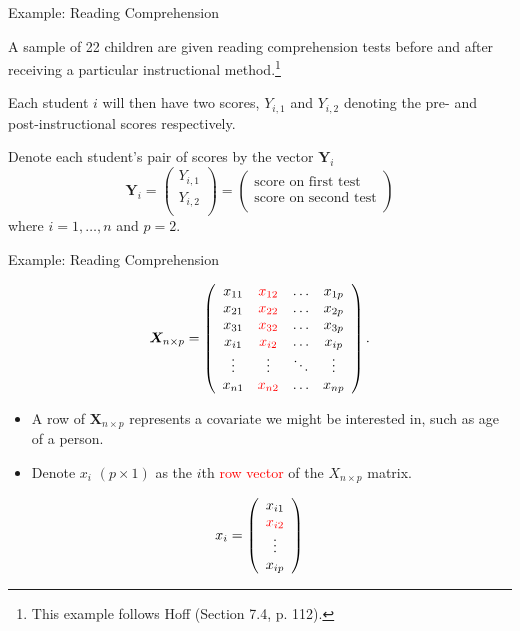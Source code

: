 \documentclass[
  ignorenonframetext,
]{beamer}
\begin{document}
\begin{frame}{Example: Reading Comprehension}
\protect\hypertarget{example-reading-comprehension}{}

A sample of 22 children are given reading comprehension tests before and
after receiving a particular instructional
method.\footnote{This example follows Hoff (Section 7.4, p. 112).}

Each student \(i\) will then have two scores, \(Y_{i,1}\) and
\(Y_{i,2}\) denoting the pre- and post-instructional scores
respectively.

Denote each student's pair of scores by the vector \(\bm{Y}_i\) \[
\bm{Y}_{i} = \left( \begin{array}{c}
Y_{i,1}\\
Y_{i,2}\\
\end{array} \right) 
= \left( \begin{array}{c}
\text{score on first test}\\
\text{score on second test}\\
\end{array} \right)
\] where \(i=1,\ldots,n\) and \(p=2.\)

\end{frame}

\begin{frame}{Example: Reading Comprehension}
\protect\hypertarget{example-reading-comprehension-1}{}

\[\bm{X}_{n \times p} = 
\left( \begin{array}{cccc}
x_{11} & \textcolor{red}{x_{12}} & \ldots&  x_{1p}\\
x_{21} & \textcolor{red}{x_{22}} & \ldots& x_{2p} \\
x_{31} & \textcolor{red}{x_{32}} & \ldots& x_{3p} \\
x_{i1} & \textcolor{red}{x_{i2}} & \ldots& x_{ip} \\
\vdots & \vdots & \ddots & \vdots \\
x_{n1} & \textcolor{red}{x_{n2}} &\ldots& x_{np}
\end{array} \right).
\]

\begin{itemize}
\item
  A row of \(\bm{X}_{n \times p}\) represents a covariate we might be
  interested in, such as age of a person.
\item
  Denote \(x_{i}\) \((p \times 1)\) as the \(i\)th
  \textcolor{red}{row vector} of the \(X_{n \times p}\) matrix.
\end{itemize}

\[  x_{i}= \left( \begin{array}{c}
x_{i1}\\
\textcolor{red}{x_{i2}}\\
\vdots\\
x_{ip}
\end{array} \right) \]

\end{frame}
\end{document}

